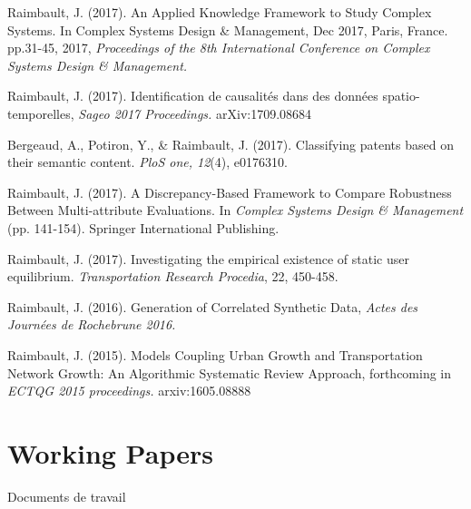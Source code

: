 \bigskip

\noindent Raimbault, J. (2017). An Applied Knowledge Framework to Study Complex Systems.%
In Complex Systems Design \& Management, Dec 2017, Paris, France. pp.31-45, 2017, \textit{Proceedings of the 8th International Conference on Complex Systems Design \& Management.}


\bigskip

\noindent Raimbault, J. (2017). Identification de causalités dans des données spatio-temporelles, \textit{Sageo 2017 Proceedings.} arXiv:1709.08684




\bigskip

\noindent Bergeaud, A., Potiron, Y., \& Raimbault, J. (2017). Classifying patents based on their semantic content. \textit{PloS one, 12}(4), e0176310.

\bigskip

\noindent Raimbault, J. (2017). A Discrepancy-Based Framework to Compare Robustness Between Multi-attribute Evaluations. In \textit{Complex Systems Design \& Management} (pp. 141-154). Springer International Publishing. 

\bigskip

\noindent Raimbault, J. (2017). Investigating the empirical existence of static user equilibrium. \textit{Transportation Research Procedia}, 22, 450-458. 


\bigskip


\noindent Raimbault, J. (2016). Generation of Correlated Synthetic Data, \textit{Actes des Journ{\'e}es de Rochebrune 2016.}


\bigskip

\noindent Raimbault, J. (2015). Models Coupling Urban Growth and Transportation Network Growth: An Algorithmic Systematic Review Approach, forthcoming in \textit{ECTQG 2015 proceedings.} arxiv:1605.08888



\section*{Working Papers}{Documents de travail}



